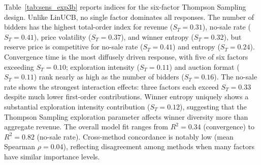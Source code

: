 Table~\ref{tab:sens_exp3b} reports indices for the six-factor Thompson Sampling design. Unlike LinUCB, no single factor dominates all responses. The number of bidders has the highest total-order index for revenue ($S_T = 0.31$), no-sale rate ($S_T = 0.41$), price volatility ($S_T = 0.37$), and winner entropy ($S_T = 0.32$), but reserve price is competitive for no-sale rate ($S_T = 0.41$) and entropy ($S_T = 0.24$). Convergence time is the most diffusely driven response, with five of six factors exceeding $S_T = 0.10$; exploration intensity ($S_T = 0.11$) and auction format ($S_T = 0.11$) rank nearly as high as the number of bidders ($S_T = 0.16$). The no-sale rate shows the strongest interaction effects: three factors each exceed $S_T = 0.33$ despite much lower first-order contributions. Winner entropy uniquely shows a substantial exploration intensity contribution ($S_T = 0.12$), suggesting that the Thompson Sampling exploration parameter affects winner diversity more than aggregate revenue. The overall model fit ranges from $R^2 = 0.34$ (convergence) to $R^2 = 0.82$ (no-sale rate). Cross-method concordance is notably low (mean Spearman $\rho = 0.04$), reflecting disagreement among methods when many factors have similar importance levels.

\begin{table}[H]
\centering
\caption{Experiment~3b: Analytical Sobol' indices for all five Thompson Sampling response variables.}
\label{tab:sens_exp3b}
\footnotesize
{}
\end{table}

